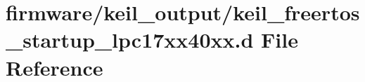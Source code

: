 \hypertarget{keil__freertos__startup__lpc17xx40xx_8d}{\section{firmware/keil\-\_\-output/keil\-\_\-freertos\-\_\-startup\-\_\-lpc17xx40xx.d File Reference}
\label{keil__freertos__startup__lpc17xx40xx_8d}
}
